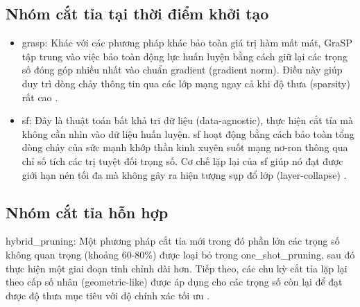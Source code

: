         \subsection{Nhóm cắt tỉa tại thời điểm khởi tạo}
            \begin{itemize}
                \item \gls{grasp}:  Khác với các phương pháp khác bảo toàn giá trị hàm mất mát, GraSP tập trung vào việc bảo toàn động lực huấn luyện bằng cách giữ lại các trọng số đóng góp nhiều nhất vào chuẩn gradient (gradient norm). Điều này giúp duy trì dòng chảy thông tin qua các lớp mạng ngay cả khi độ thưa (sparsity) rất cao \cite{grasp}.
                
                \item \gls{sf}: Đây là thuật toán bất khả tri dữ liệu (data-agnostic), thực hiện cắt tỉa mà không cần nhìn vào dữ liệu huấn luyện. \gls{sf} hoạt động bằng cách bảo toàn tổng dòng chảy của sức mạnh khớp thần kinh xuyên suốt mạng nơ-ron thông qua chỉ số tích các trị tuyệt đối trọng số. Cơ chế lặp lại của \gls{sf} giúp nó đạt được giới hạn nén tối đa mà không gây ra hiện tượng sụp đổ lớp (layer-collapse) \cite{synflow}.
            \end{itemize}

        \subsection{Nhóm cắt tỉa hỗn hợp}
            \gls{hybrid_pruning}: Một phương pháp cắt tỉa mới trong đó phần lớn các trọng số không quan trọng (khoảng 60-80\%) được loại bỏ trong \gls{one_shot_pruning}, sau đó thực hiện một giai đoạn tinh chỉnh dài hơn. Tiếp theo, các chu kỳ cắt tỉa lặp lại theo cấp số nhân (geometric-like) được áp dụng cho các trọng số còn lại để đạt được độ thưa mục tiêu với độ chính xác tối ưu \cite{hybrid}.


